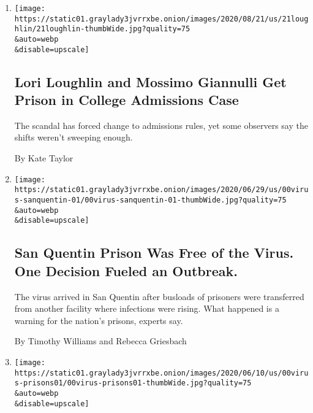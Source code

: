 \begin{enumerate}
\def\labelenumi{\arabic{enumi}.}
\item
  \href{/2020/08/21/us/lori-loughlin-mossimo-giannulli-sentencing.html}{}

  \texttt{[image: https://static01.graylady3jvrrxbe.onion/images/2020/08/21/us/21loughlin/21loughlin-thumbWide.jpg?quality=75\\\&auto=webp\\\&disable=upscale]}

  \hypertarget{lori-loughlin-and-mossimo-giannulli-get-prison-in-college-admissions-case}{%
  \subsection{Lori Loughlin and Mossimo Giannulli Get Prison in College
  Admissions
  Case}\label{lori-loughlin-and-mossimo-giannulli-get-prison-in-college-admissions-case}}

  The scandal has forced change to admissions rules, yet some observers
  say the shifts weren't sweeping enough.

  By Kate Taylor
\item
  \href{/2020/06/30/us/san-quentin-prison-coronavirus.html}{}

  \texttt{[image: https://static01.graylady3jvrrxbe.onion/images/2020/06/29/us/00virus-sanquentin-01/00virus-sanquentin-01-thumbWide.jpg?quality=75\\\&auto=webp\\\&disable=upscale]}

  \hypertarget{san-quentin-prison-was-free-of-the-virus-one-decision-fueled-an-outbreak}{%
  \subsection{San Quentin Prison Was Free of the Virus. One Decision
  Fueled an
  Outbreak.}\label{san-quentin-prison-was-free-of-the-virus-one-decision-fueled-an-outbreak}}

  The virus arrived in San Quentin after busloads of prisoners were
  transferred from another facility where infections were rising. What
  happened is a warning for the nation's prisons, experts say.

  By Timothy Williams and Rebecca Griesbach
\item
  \href{/2020/06/16/us/coronavirus-inmates-prisons-jails.html}{}

  \texttt{[image: https://static01.graylady3jvrrxbe.onion/images/2020/06/10/us/00virus-prisons01/00virus-prisons01-thumbWide.jpg?quality=75\\\&auto=webp\\\&disable=upscale]}

  \hypertarget{coronavirus-cases-rise-sharply-in-prisons-even-as-they-plateau-nationwide}{%
}
\end{enumerate}
